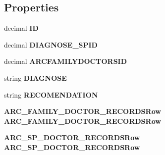 \subsection*{Properties}
\begin{CompactItemize}
\item 
decimal \textbf{ID}\hspace{0.3cm}{\tt  [get, set]}\label{class_automatic_medical_system_1_1_data_set2_1_1_d_i_a_g_n_o_s_e___f_m___d_o_c_t_o_r_row_b7381b22bfe514008f8d995622787d31}

\item 
decimal \textbf{DIAGNOSE\_\-SPID}\hspace{0.3cm}{\tt  [get, set]}\label{class_automatic_medical_system_1_1_data_set2_1_1_d_i_a_g_n_o_s_e___f_m___d_o_c_t_o_r_row_47ad7de191b205279bc78683f0a195c4}

\item 
decimal \textbf{ARCFAMILYDOCTORSID}\hspace{0.3cm}{\tt  [get, set]}\label{class_automatic_medical_system_1_1_data_set2_1_1_d_i_a_g_n_o_s_e___f_m___d_o_c_t_o_r_row_bd0ac446ee0671a574d6d745e531987a}

\item 
string \textbf{DIAGNOSE}\hspace{0.3cm}{\tt  [get, set]}\label{class_automatic_medical_system_1_1_data_set2_1_1_d_i_a_g_n_o_s_e___f_m___d_o_c_t_o_r_row_73b5b4abc94483fb12bfb267b4b99ef7}

\item 
string \textbf{RECOMENDATION}\hspace{0.3cm}{\tt  [get, set]}\label{class_automatic_medical_system_1_1_data_set2_1_1_d_i_a_g_n_o_s_e___f_m___d_o_c_t_o_r_row_81110d18f77d0749d036bfe17289c353}

\item 
{\bf ARC\_\-FAMILY\_\-DOCTOR\_\-RECORDSRow} \textbf{ARC\_\-FAMILY\_\-DOCTOR\_\-RECORDSRow}\hspace{0.3cm}{\tt  [get, set]}\label{class_automatic_medical_system_1_1_data_set2_1_1_d_i_a_g_n_o_s_e___f_m___d_o_c_t_o_r_row_d822c65d7aff1a28d01292d76c986d55}

\item 
{\bf ARC\_\-SP\_\-DOCTOR\_\-RECORDSRow} \textbf{ARC\_\-SP\_\-DOCTOR\_\-RECORDSRow}\hspace{0.3cm}{\tt  [get, set]}\label{class_automatic_medical_system_1_1_data_set2_1_1_d_i_a_g_n_o_s_e___f_m___d_o_c_t_o_r_row_c2d16e8bf9b5ce38434375b717de0a24}

\end{CompactItemize}


